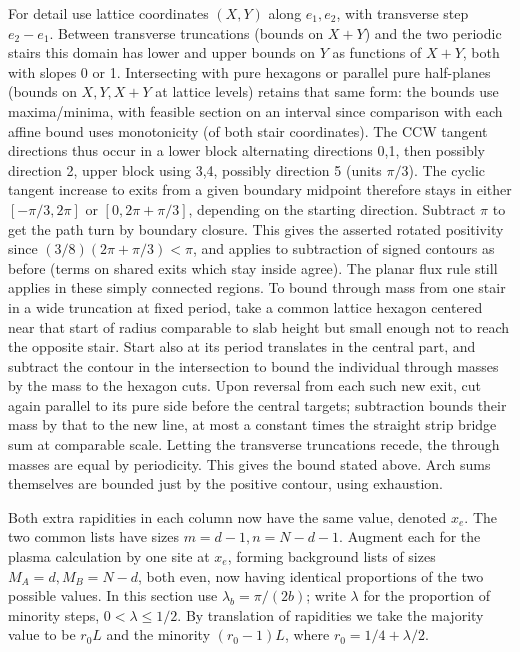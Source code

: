For detail use lattice coordinates \((X,Y)\) along \(e_1,e_2\), with transverse step \(e_2-e_1\). Between transverse truncations (bounds on \(X+Y\)) and the two periodic stairs this domain has lower and upper bounds on \(Y\) as functions of \(X+Y\), both with slopes 0 or 1. Intersecting with pure hexagons or parallel pure half-planes (bounds on \(X,Y,X+Y\) at lattice levels) retains that same form: the bounds use maxima/minima, with feasible section on an interval since comparison with each affine bound uses monotonicity (of both stair coordinates). The CCW tangent directions thus occur in a lower block alternating directions 0,1, then possibly direction 2, upper block using 3,4, possibly direction 5 (units \(\pi/3\)). The cyclic tangent increase to exits from a given boundary midpoint therefore stays in either \([-\pi/3,2\pi]\) or \([0,2\pi+\pi/3]\), depending on the starting direction. Subtract \(\pi\) to get the path turn by boundary closure. This gives the asserted rotated positivity since \((3/8)(2\pi+\pi/3)<\pi\), and applies to subtraction of signed contours as before (terms on shared exits which stay inside agree). The planar flux rule still applies in these simply connected regions. To bound through mass from one stair in a wide truncation at fixed period, take a common lattice hexagon centered near that start of radius comparable to slab height but small enough not to reach the opposite stair. Start also at its period translates in the central part, and subtract the contour in the intersection to bound the individual through masses by the mass to the hexagon cuts. Upon reversal from each such new exit, cut again parallel to its pure side before the central targets; subtraction bounds their mass by that to the new line, at most a constant times the straight strip bridge sum at comparable scale. Letting the transverse truncations recede, the through masses are equal by periodicity. This gives the bound stated above. Arch sums themselves are bounded just by the positive contour, using exhaustion.



Both extra rapidities in each column now have the same value, denoted \(x_e\). The two common lists have sizes \(m=d-1,n=N-d-1\). Augment each for the plasma calculation by one site at \(x_e\), forming background lists of sizes \(M_A=d,M_B=N-d\), both even, now having identical proportions of the two possible values. In this section use \(\lambda_b=\pi/(2b)\); write \(\lambda\) for the proportion of minority steps, \(0<\lambda\le1/2\). By translation of rapidities we take the majority value to be \(r_0 L\) and the minority \((r_0-1)L\), where \(r_0=1/4+\lambda/2\).



